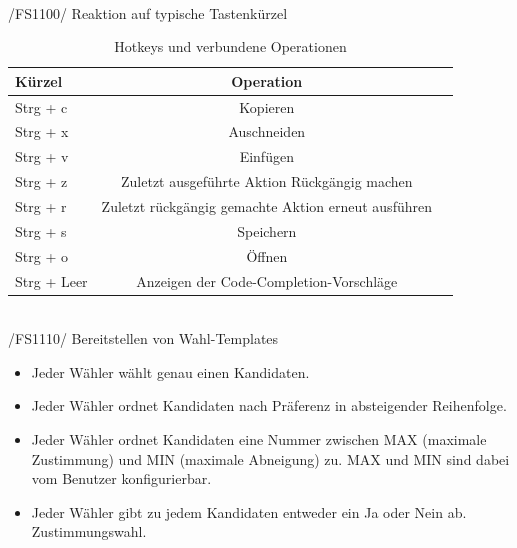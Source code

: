 \documentclass[a4paper]{scrreprt}
\begin{document}
\\
/FS1100/ Reaktion auf typische Tastenkürzel\\
\begin{table}[H]
\caption{Hotkeys und verbundene Operationen}
\begin{tabular}{lcr} 
Kürzel & Operation \\
\hline 
Strg + c & Kopieren \\
Strg + x & Auschneiden \\
Strg + v & Einfügen \\
Strg + z & Zuletzt ausgeführte Aktion Rückgängig machen \\
Strg + r & Zuletzt rückgängig gemachte Aktion erneut ausführen \\
Strg + s & Speichern \\
Strg + o & Öffnen \\
Strg + Leer & Anzeigen der Code-Completion-Vorschläge\\
\end{tabular}
\label{table:Hotkeys_and_operations}
\end{table}
\\
/FS1110/ Bereitstellen von Wahl-Templates
\begin{itemize}
\item Jeder Wähler wählt genau einen Kandidaten.
\item Jeder Wähler ordnet Kandidaten nach Präferenz in absteigender Reihenfolge.
\item Jeder Wähler ordnet Kandidaten eine Nummer zwischen MAX (maximale Zustimmung) und MIN (maximale Abneigung) zu. MAX und MIN sind dabei vom \gls{Benutzer} konfigurierbar. 
\item Jeder Wähler gibt zu jedem Kandidaten entweder ein Ja oder Nein ab. Zustimmungswahl.
\end{itemize}
\end{document}
